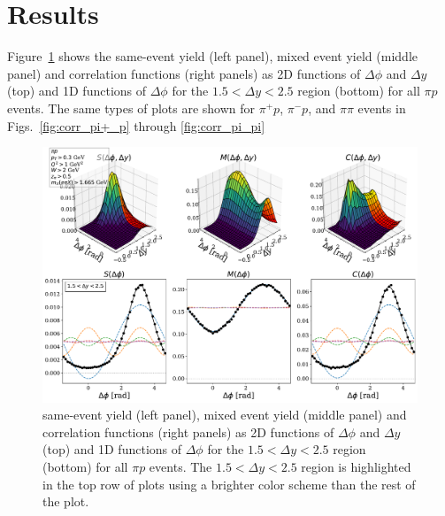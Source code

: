 \section{Results} \label{sec:results}

Figure~\ref{fig:corr_pi_p} shows the same-event yield (left panel), mixed event yield (middle panel) and correlation functions (right panels) as 2D functions of $\Delta\phi$ and $\Delta y$ (top) and 1D functions of $\Delta\phi$  for the $1.5<\Delta y<2.5$ region (bottom) for all $\pi p$ events.  The same types of plots are shown for $\pi^+p$, $\pi^-p$, and $\pi\pi$ events in Figs.~\ref{fig:corr_pi+_p} through \ref{fig:corr_pi_pi}

\begin{figure}
    \centering
    \includegraphics[width=\textwidth]{smc_pi_p.pdf}
    \caption{same-event yield (left panel), mixed event yield (middle panel) and correlation functions (right panels) as 2D functions of $\Delta\phi$ and $\Delta y$ (top) and 1D functions of $\Delta\phi$  for the $1.5<\Delta y<2.5$ region (bottom) for all $\pi p$ events.  The $1.5<\Delta y<2.5$ region is highlighted in the top row of plots using a brighter color scheme than the rest of the plot.}
    \label{fig:corr_pi_p}
\end{figure}



